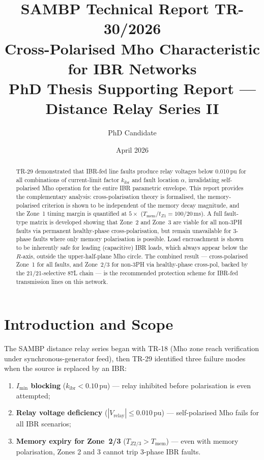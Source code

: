 \documentclass[11pt,a4paper]{article}
\title{%
  \textbf{\Large SAMBP Technical Report TR-30/2026}\\[6pt]
  \textbf{\large Cross-Polarised Mho Characteristic for IBR Networks}\\[4pt]
  \normalsize PhD Thesis Supporting Report --- Distance Relay Series II
}
\author{PhD Candidate}
\date{April 2026}
\begin{document}
\maketitle\thispagestyle{fancy}

\begin{abstract}
TR-29 demonstrated that IBR-fed line faults produce relay voltages below
0.010\,pu for all combinations of current-limit factor $k_\mathrm{ibr}$ and fault
location $\alpha$, invalidating self-polarised Mho operation for the entire IBR
parametric envelope.  This report provides the complementary analysis:
cross-polarisation theory is formalised, the memory-polarised criterion is shown
to be independent of the memory decay magnitude, and the Zone~1 timing margin is
quantified at $5\times$ ($T_\mathrm{mem}/t_{Z1} = 100/20$\,ms).  A full fault-type
matrix is developed showing that Zone~2 and Zone~3 are viable for all non-3PH
faults via permanent healthy-phase cross-polarisation, but remain unavailable for
3-phase faults where only memory polarisation is possible.  Load encroachment is
shown to be inherently safe for leading (capacitive) IBR loads, which always
appear below the $R$-axis, outside the upper-half-plane Mho circle.  The combined
result --- cross-polarised Zone~1 for all faults, and Zone~2/3 for non-3PH via
healthy-phase cross-pol, backed by the 21/21-selective 87L chain --- is the
recommended protection scheme for IBR-fed transmission lines on this network.
\end{abstract}

\tableofcontents\newpage

\section{Introduction and Scope}
\label{sec:intro}

The SAMBP distance relay series began with TR-18 (Mho zone reach verification
under synchronous-generator feed), then TR-29 identified three failure modes when
the source is replaced by an IBR:
\begin{enumerate}[label=(\roman*)]
  \item \textbf{$I_\mathrm{min}$ blocking} ($k_\mathrm{ibr}<0.10$\,pu) --- relay
        inhibited before polarisation is even attempted;
  \item \textbf{Relay voltage deficiency} ($|V_\mathrm{relay}|\leq 0.010$\,pu) ---
        self-polarised Mho fails for all IBR scenarios;
  \item \textbf{Memory expiry for Zone~2/3} ($T_{Z2/3}>T_\mathrm{mem}$) --- even with
        memory polarisation, Zones 2 and 3 cannot trip 3-phase IBR faults.
\end{enumerate}
\end{document}
